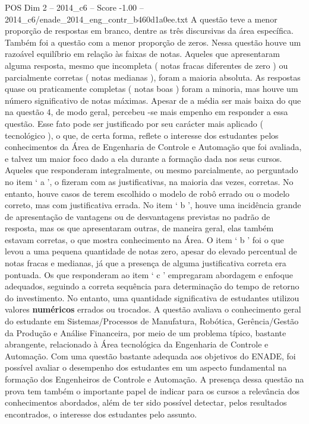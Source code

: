 \begin{textsample}{POS Dim 2 – 2014\_c6 – Score -1.00 – 2014\_c6/enade\_2014\_eng\_contr\_b460d1a0ee.txt}
A questão teve a menor proporção de respostas em branco, dentre as três discursivas da área específica.
Também foi a questão com a menor proporção de zeros.
Nessa questão houve um razoável equilíbrio em relação às faixas de notas.
Aqueles que apresentaram alguma resposta, mesmo que incompleta ( notas fracas diferentes de zero ) ou parcialmente corretas ( notas medianas ), foram a maioria absoluta.
As respostas quase ou praticamente completas ( notas boas ) foram a minoria, mas houve um número significativo de notas máximas.
Apesar de a média ser mais baixa do que na questão 4, de modo geral, percebeu -se mais empenho em responder a essa questão.
Esse fato pode ser justificado por seu carácter mais aplicado ( tecnológico ), o que, de certa forma, reflete o interesse dos estudantes pelos conhecimentos da Área de Engenharia de Controle e Automação que foi avaliada, e talvez um maior foco dado a ela durante a formação dada nos seus cursos.
Aqueles que responderam integralmente, ou mesmo parcialmente, ao perguntado no item ‘ a ’, o fizeram com as justificativas, na maioria das vezes, corretas.
No entanto, houve casos de terem escolhido o modelo de robô errado ou o modelo correto, mas com justificativa errada.
No item ‘ b ’, houve uma incidência grande de apresentação de vantagens ou de desvantagens previstas no padrão de resposta, mas os que apresentaram outras, de maneira geral, elas também estavam corretas, o que mostra conhecimento na Área.
O item ‘ b ’ foi o que levou a uma pequena quantidade de notas zero, apesar do elevado percentual de notas fracas e medianas, já que a presença de alguma justificativa correta era pontuada.
Os que responderam ao item ‘ c ’ empregaram abordagem e enfoque adequados, seguindo a correta sequência para determinação do tempo de retorno do investimento.
No entanto, uma quantidade significativa de estudantes utilizou valores \textbf{numéricos} errados ou trocados.
A questão avaliava o conhecimento geral do estudante em Sistemas/Processos de Manufatura, Robótica, Gerência/Gestão da Produção e Análise Financeira, por meio de um problema típico, bastante abrangente, relacionado à Área tecnológica da Engenharia de Controle e Automação.
Com uma questão bastante adequada aos objetivos do ENADE, foi possível avaliar o desempenho dos estudantes em um aspecto fundamental na formação dos Engenheiros de Controle e Automação.
A presença dessa questão na prova tem também o importante papel de indicar para os cursos a relevância dos conhecimentos abordados, além de ter sido possível detectar, pelos resultados encontrados, o interesse dos estudantes pelo assunto.

\end{textsample}
